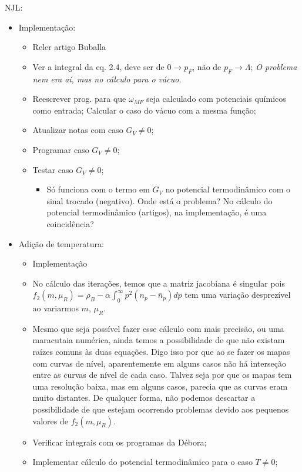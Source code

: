 NJL:
\begin{itemize}
	\item Implementação:
		\begin{itemize}
			\item[\checkmark] Reler artigo Buballa\cite{Buballa1996}
			\item[\checkmark] Ver a integral da eq. 2.4, deve ser de $0 \to p_F$, não de $p_F \to \Lambda$; \textit{O problema nem era aí, mas no cálculo para o vácuo.}
			\item[\checkmark] Reescrever prog. para que $\omega_{MF}$ seja calculado com potenciais químicos como entrada; Calcular o caso do vácuo com a mesma função;
			\item Atualizar notas com caso $G_V \neq 0$;
			\item[\checkmark] Programar caso $G_V \neq 0$;
			\item[\checkmark] Testar caso $G_V \neq 0$;
				\begin{itemize}
					\item Só funciona com o termo em $G_V$ no potencial termodinâmico com o sinal trocado (negativo). Onde está o problema? No cálculo do potencial termodinâmico (artigos), na implementação, é uma coincidência?
				\end{itemize}
		\end{itemize}
	\item Adição de temperatura:
		\begin{itemize}
			\item[\checkmark] Implementação
			\item No cálculo das iterações, temos que a matriz jacobiana é singular pois $f_2(m, \mu_R) = \rho_B - \alpha\int_0^\infty p^2 (n_p - \bar{n}_p) dp$ tem uma variação desprezível ao variarmos $m$, $\mu_R$.
			\item Mesmo que seja possível fazer esse cálculo com mais precisão, ou uma maracutaia numérica, ainda temos a possibilidade de que não existam raízes comuns às duas equações. Digo isso por que ao se fazer os mapas com curvas de nível, aparentemente em alguns casos não há interseção entre as curvas de nível de cada caso. Talvez seja por que os mapas tem uma resolução baixa, mas em alguns casos, parecia que as curvas eram muito distantes. De qualquer forma, não podemos descartar a possibilidade de que estejam ocorrendo problemas devido aos pequenos valores de $f_2(m,\mu_R)$.
			\item Verificar integrais com os programas da Débora;
			\item Implementar cálculo do potencial termodinâmico para o caso $T \neq 0$;

\end{itemize}
\end{itemize}
